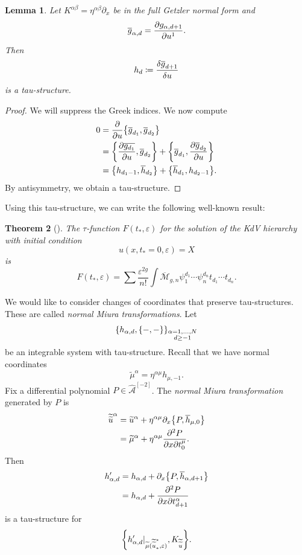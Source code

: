 \documentclass[leqno, openany]{memoir}
\newtheorem{thm}{Theorem}[section]
\newtheorem{lem}[thm]{Lemma}
\theoremstyle{definition}
\theoremstyle{remark}
\theoremstyle{plain}
\theoremstyle{definition}
\theoremstyle{remark}
\newcommand{\ep}{\varepsilon}
\newcommand{\mc}[1]{\mathcal{#1}}
\newcommand{\ol}[1]{\overline{#1}}
\newcommand{\wt}[1]{\widetilde{#1}}
\newcommand{\wh}[1]{\widehat{#1}}
\begin{document}
\begin{lem}
    Let $K^{\alpha\beta} = \eta^{\alpha\beta} \partial_x$ be in the full Getzler normal form and
    \[ \ol{g}_{\alpha,d} = \pdv{g_{\alpha,d+1}}{u^1}. \]
    Then 
    \[ h_d \coloneqq \fdv{\ol{g}_{d+1}}{u} \]
    is a tau-structure.
\end{lem}

\begin{proof}
    We will suppress the Greek indices. We now compute
    \begin{align*}
        0 &= \pdv{u} \qty{\ol{g}_{d_1}, \ol{g}_{d_2}} \\
        &= \qty{\pdv{\ol{g_{d_1}}}{u}, \ol{g}_{d_2}} + \qty{\ol{g}_{d_1}, \pdv{\ol{g}_{d_2}}{u}} \\
        &= \qty{h_{d_1-1}, \ol{h}_{d_2}} + \qty{\ol{h}_{d_1}, h_{d_2-1}}.
    \end{align*}
    By antisymmetry, we obtain a tau-structure.
\end{proof}

Using this tau-structure, we can write the following well-known result:
\begin{thm}[\cite{wittenconj}]
    The $\tau$-function $F(t_*, \ep)$ for the solution of the KdV hierarchy with initial condition
    \[ u(x, t_* = 0, \ep) = X \]
    is
    \[ F(t_*, \ep) = \sum \frac{\ep^{2g}}{n!} \int{\ol{\mc{M}}_{g, n}} \psi_1^{d_1} \cdots \psi_n^{d_n} t_{d_1} \cdots t_{d_n}. \]
\end{thm}

We would like to consider changes of coordinates that preserve tau-structures. These are called \textit{normal Miura transformations}. Let 
\[ \qty{h_{\alpha,d}, \qty{-,-}}_{\substack{\alpha = 1,\ldots,N \\ d \geq -1}} \]
be an integrable system with tau-structure. Recall that we have normal coordinates
\[ \wt{\mu}^{\alpha} = \eta^{\alpha \mu} h_{\mu,-1}. \]
Fix a differential polynomial $P \in \wh{\mc{A}}^{[-2]}$. The \textit{normal Miura transformation} generated by $P$ is
\begin{align*}
    \wt{\wt{u}}^{\alpha} &= \wt{u}^{\alpha} + \eta^{\alpha \mu} \partial_x \qty{P, \ol{h}_{\mu, 0}} \\
    &= \wt{\mu}^{\alpha} + \eta^{\alpha \mu} \pdv{P}{x}{t_0^{\mu}}.
\end{align*}
Then
\begin{align*}
    h'_{\alpha,d} &= h_{\alpha,d} + \partial_x \qty{P, \ol{h}_{\alpha,d+1}} \\
    &= h_{\alpha,d} + \pdv{P}{x}{t_{d+1}^{\alpha}}
\end{align*}
is a tau-structure for
\[ \qty{h'_{\alpha, d} |_{\wt{\mu}(\wt{\wt{u}}_*^*, \ep)}, K_{\wt{\wt{u}}}}. \]
\end{document}
